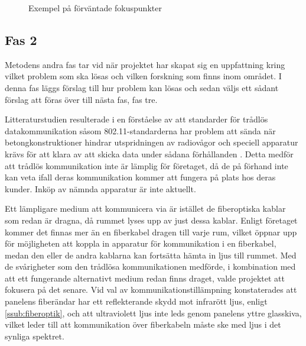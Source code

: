         \begin{figure}[hbt]
        \centering
            \begin{subfigure}{0.2\textwidth}
            \end{subfigure}
            \begin{subfigure}{0.2\textwidth}
            \end{subfigure}
        \caption{\label{fig:array} Exempel på förväntade fokuspunkter}
        \end{figure}

    \subsection{Fas 2} %
    \label{sub:steg_2}
        Metodens andra fas tar vid när projektet har skapat sig en uppfattning kring vilket problem som ska lösas och vilken forskning som finns inom området. I denna fas läggs förslag till hur problem kan lösas och sedan väljs ett sådant förslag att föras över till nästa fas, fas tre.\bigskip

        Litteraturstudien resulterade i en förståelse av att standarder för trådlös datakommunikation såsom 802.11-standarderna har problem att sända när betongkonstruktioner hindrar utspridningen av radiovågor och speciell apparatur krävs för att klara av att skicka data under sådana förhållanden \cite{11n}. Detta medför att trådlös kommunikation inte är lämplig för företaget, då de på förhand inte kan veta ifall deras kommunikation kommer att fungera på plats hos deras kunder. Inköp av nämnda apparatur är inte aktuellt. \bigskip

        Ett lämpligare medium att kommunicera via är istället de fiberoptiska kablar som redan är dragna, då rummet lyses upp av just dessa kablar. Enligt företaget kommer det finnas mer än en fiberkabel dragen till varje rum, vilket öppnar upp för möjligheten att koppla in apparatur för kommunikation i en fiberkabel, medan den eller de andra kablarna kan fortsätta hämta in ljus till rummet. Med de svårigheter som den trådlösa kommunikationen medförde, i kombination med att ett fungerande alternativt medium redan finns draget, valde projektet att fokusera på det senare. Vid val av kommunikationstillämpning konstaterades att panelens fiberändar har ett reflekterande skydd mot infrarött ljus, enligt \ref{ssub:fiberoptik}, och att ultraviolett ljus inte leds genom panelens yttre glasskiva, vilket leder till att kommunikation över fiberkabeln måste ske med ljus i det synliga spektret. \bigskip

